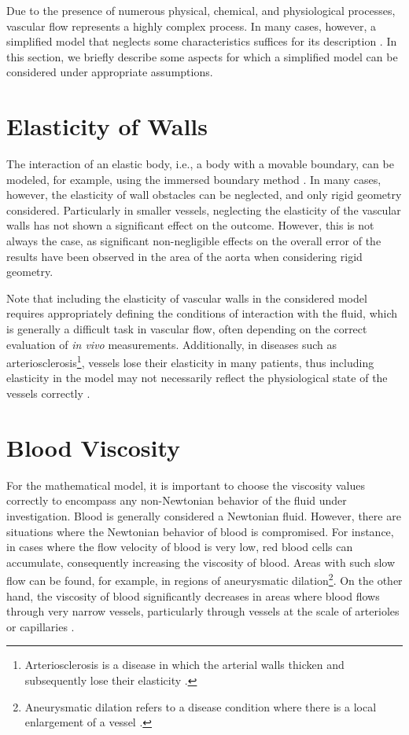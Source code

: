 Due to the presence of numerous physical, chemical, and physiological processes, vascular flow represents a highly complex process. In many cases, however, a simplified model that neglects some characteristics suffices for its description \cite{Saloner2019}. In this section, we briefly describe some aspects for which a simplified model can be considered under appropriate assumptions.

\section*{\fontsize{11}{15}\selectfont Elasticity of Walls}
The interaction of an elastic body, i.e., a body with a movable boundary, can be modeled, for example, using the immersed boundary method \cite{Peskin}. In many cases, however, the elasticity of wall obstacles can be neglected, and only rigid geometry considered. Particularly in smaller vessels, neglecting the elasticity of the vascular walls has not shown a significant effect on the outcome. \cite{DempereMarco2006} However, this is not always the case, as significant non-negligible effects on the overall error of the results have been observed in the area of the aorta when considering rigid geometry. \cite{LANTZ2011}

Note that including the elasticity of vascular walls in the considered model requires appropriately defining the conditions of interaction with the fluid, which is generally a difficult task in vascular flow, often depending on the correct evaluation of \textit{in vivo} measurements. Additionally, in diseases such as arteriosclerosis\footnote{Arteriosclerosis is a disease in which the arterial walls thicken and subsequently lose their elasticity \cite{Fishbein2015}.}, vessels lose their elasticity in many patients, thus including elasticity in the model may not necessarily reflect the physiological state of the vessels correctly \cite{Saloner2019}.

\section*{\fontsize{11}{15}\selectfont Blood Viscosity}

For the mathematical model, it is important to choose the viscosity values correctly to encompass any non-Newtonian behavior of the fluid under investigation. Blood is generally considered a Newtonian fluid. However, there are situations where the Newtonian behavior of blood is compromised. For instance, in cases where the flow velocity of blood is very low, red blood cells can accumulate, consequently increasing the viscosity of blood.
Areas with such slow flow can be found, for example, in regions of aneurysmatic dilation\footnote{Aneurysmatic dilation refers to a disease condition where there is a local enlargement of a vessel \cite{Syed1997}.}. On the other hand, the viscosity of blood significantly decreases in areas where blood flows through very narrow vessels, particularly through vessels at the scale of arterioles or capillaries \cite{Saloner2019}.

